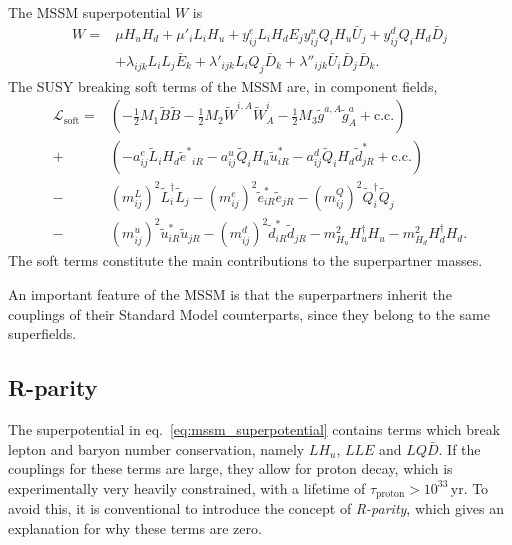 \documentclass[twoside,english]{uiofysmaster}
\begin{document}
The MSSM superpotential $W$ is
\begin{align}
	W = &\mu H_u H_d + \mu'_i L_i H_u + y_{ij}^e L_i H_d E_j y_{ij}^u Q_i H_u \bar U_j + y_{ij}^d Q_i H_d \bar D_j \label{eq:mssm_superpotential} \\
		&+\lambda_{ijk}L_i L_j \bar E_k + \lambda'_{ijk} L_i Q_j \bar D_k + \lambda''_{ijk} \bar U_i \bar D_j \bar D_k.\nonumber
\end{align} 
The SUSY breaking soft terms of the MSSM are, in component fields,
\begin{align}
	\mathcal{L}_\mathrm{soft} = &\left( -\frac{1}{2}M_1 \tilde B \tilde B - \frac{1}{2}M_2 \tilde W^{i,A} \tilde W^i_A - \frac{1}{2}M_3 \tilde g^{a,A}\tilde g^a_A + \mathrm{c.c.} \right)\nonumber\\
	+ &\left(-a_{ij}^e \tilde L_i H_d {\tilde e^*}_{iR} - a_{ij}^u \tilde Q_i H_u \tilde u^*_{iR} - a_{ij}^d \tilde Q_i H_d \tilde d^*_{jR} + \mathrm{c.c.} \right)\\
	- &(m_{ij}^L)^2 \tilde L_i^\dag \tilde L_j - (m_{ij}^e)^2 {\tilde e_{iR}^*} {\tilde e_{jR}} - (m_{ij}^Q)^2 \tilde Q_i^\dag \tilde Q_j \nonumber \\
	- &(m_{ij}^u)^2 {\tilde u_{iR}^*} {\tilde u_{jR}} - (m_{ij}^d)^2 {\tilde d_{iR}^*} {\tilde d_{jR}} - m^2_{H_u} H^\dag_u H_u - m^2_{H_d} H^\dag_d H_d.\nonumber
\end{align}
The soft terms constitute the main contributions to the superpartner masses. 

An important feature of the MSSM is that the superpartners inherit the couplings of their Standard Model counterparts, since they belong to the same superfields.

\subsection{R-parity}
The superpotential in eq.\ \eqref{eq:mssm_superpotential} contains terms which break lepton and baryon number conservation, namely $LH_u$, $LLE$ and $LQ\bar D$. If the couplings for these terms are large, they allow for proton decay, which is experimentally very heavily constrained, with a lifetime of $\tau_\mathrm{proton} > 10^{33} \,\mathrm{yr}$. To avoid this, it is conventional to introduce the concept of {\it R-parity}, which gives an explanation for why these terms are zero.
\end{document}
